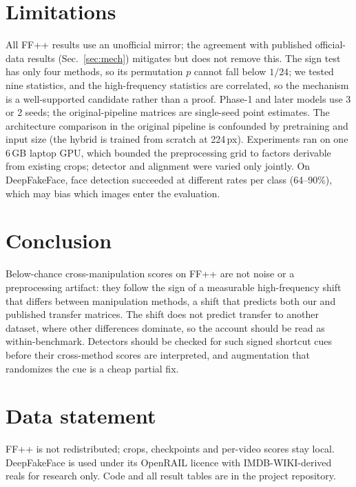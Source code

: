 \documentclass[conference]{IEEEtran}
\begin{document}
\section{Limitations}
\label{sec:limits}
All FF++ results use an unofficial mirror; the agreement with published
official-data results (Sec.~\ref{sec:mech}) mitigates but does not remove this. The
sign test has only four methods, so its permutation $p$ cannot fall below
$1/24$; we tested nine statistics, and the high-frequency statistics are
correlated, so the mechanism is a well-supported candidate rather than a
proof. Phase-1 and later models use 3 or 2 seeds; the original-pipeline
matrices are single-seed point estimates. The architecture comparison in the
original pipeline is confounded by pretraining and input size (the hybrid is
trained from scratch at 224\,px). Experiments ran on one 6\,GB laptop GPU,
which bounded the preprocessing grid to factors derivable from existing
crops; detector and alignment were varied only jointly. On DeepFakeFace,
face detection succeeded at different rates per class (64--90\%), which may
bias which images enter the evaluation.

\section{Conclusion}
Below-chance cross-manipulation scores on FF++ are not noise or a
preprocessing artifact: they follow the sign of a measurable high-frequency
shift that differs between manipulation methods, a shift that predicts both
our and published transfer matrices. The shift does not predict transfer to
another dataset, where other differences dominate, so the account should be
read as within-benchmark. Detectors should be checked for such
signed shortcut cues before their cross-method scores are interpreted, and
augmentation that randomizes the cue is a cheap partial fix.

\section*{Data statement}
FF++ is not redistributed; crops, checkpoints and per-video scores stay local.
DeepFakeFace is used under its OpenRAIL licence with IMDB-WIKI-derived reals
for research only. Code and all result tables are in the project repository.



\end{document}
